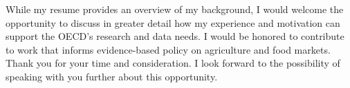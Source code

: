 \documentclass[11pt,a4paper,roman]{moderncv}
\begin{document}
\vspace{1em}
While my resume provides an overview of my background, I would welcome the opportunity to discuss in greater detail how my experience and motivation can support the OECD's research and data needs. I would be honored to contribute to work that informs evidence-based policy on agriculture and food markets.\\

\vspace{1em}
Thank you for your time and consideration. I look forward to the possibility of speaking with you further about this opportunity.

\vspace{0.5cm}


\makeletterclosing
\end{document}
